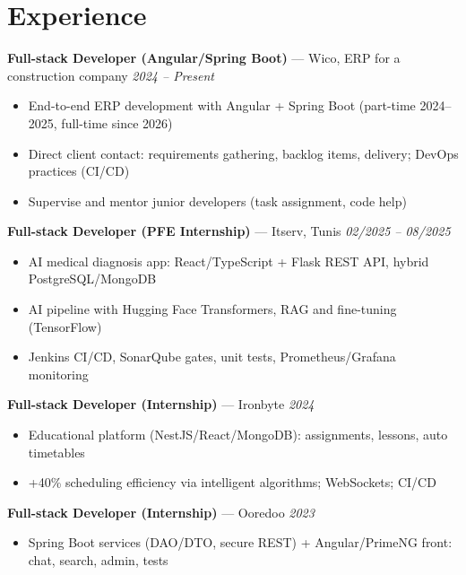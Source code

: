 \documentclass[10pt,a4paper]{article}
\begin{document}
\section*{Experience}
{\small

\textbf{Full-stack Developer (Angular/Spring Boot)} --- Wico, ERP for a construction company \hfill {\color{gray}\textit{2024 -- Present}}
\begin{itemize}[leftmargin=12pt,itemsep=0pt,topsep=1pt,parsep=0pt]
  \item End-to-end ERP development with Angular + Spring Boot (part-time 2024--2025, full-time since 2026)
  \item Direct client contact: requirements gathering, backlog items, delivery; DevOps practices (CI/CD)
  \item Supervise and mentor junior developers (task assignment, code help)
\end{itemize}

\vspace{2pt}
\textbf{Full-stack Developer (PFE Internship)} --- Itserv, Tunis \hfill {\color{gray}\textit{02/2025 -- 08/2025}}
\begin{itemize}[leftmargin=12pt,itemsep=0pt,topsep=1pt,parsep=0pt]
  \item AI medical diagnosis app: React/TypeScript + Flask REST API, hybrid PostgreSQL/MongoDB
  \item AI pipeline with Hugging Face Transformers, RAG and fine-tuning (TensorFlow)
  \item Jenkins CI/CD, SonarQube gates, unit tests, Prometheus/Grafana monitoring
\end{itemize}

\vspace{2pt}
\textbf{Full-stack Developer (Internship)} --- Ironbyte \hfill {\color{gray}\textit{2024}}
\begin{itemize}[leftmargin=12pt,itemsep=0pt,topsep=1pt,parsep=0pt]
  \item Educational platform (NestJS/React/MongoDB): assignments, lessons, auto timetables
  \item +40\% scheduling efficiency via intelligent algorithms; WebSockets; CI/CD
\end{itemize}

\vspace{2pt}
\textbf{Full-stack Developer (Internship)} --- Ooredoo \hfill {\color{gray}\textit{2023}}
\begin{itemize}[leftmargin=12pt,itemsep=0pt,topsep=1pt,parsep=0pt]
  \item Spring Boot services (DAO/DTO, secure REST) + Angular/PrimeNG front: chat, search, admin, tests
\end{itemize}

}
\end{document}

